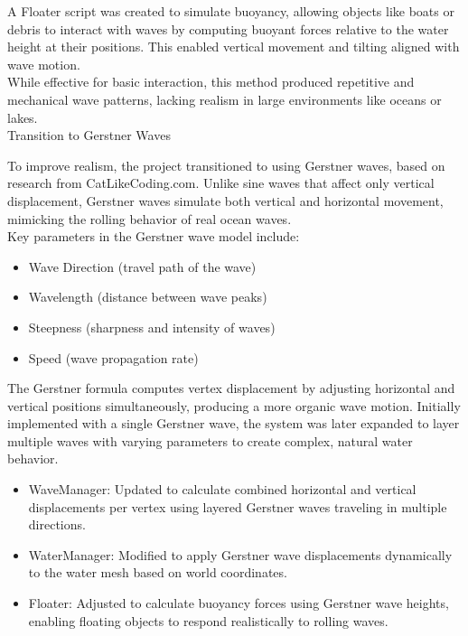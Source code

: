 \documentclass{article}
\begin{document}
A Floater script was created to simulate buoyancy, allowing objects like boats or debris to interact with waves by computing buoyant forces relative to the water height at their positions. This enabled vertical movement and tilting aligned with wave motion.\\

While effective for basic interaction, this method produced repetitive and mechanical wave patterns, lacking realism in large environments like oceans or lakes.\\

\noindent Transition to Gerstner Waves

To improve realism, the project transitioned to using Gerstner waves, based on research from CatLikeCoding.com. Unlike sine waves that affect only vertical displacement, Gerstner waves simulate both vertical and horizontal movement, mimicking the rolling behavior of real ocean waves.\\

Key parameters in the Gerstner wave model include:
\begin{itemize}
    \item Wave Direction (travel path of the wave)
    \item Wavelength (distance between wave peaks)
    \item Steepness (sharpness and intensity of waves)
    \item Speed (wave propagation rate)
\end{itemize}

The Gerstner formula computes vertex displacement by adjusting horizontal and vertical positions simultaneously, producing a more organic wave motion. Initially implemented with a single Gerstner wave, the system was later expanded to layer multiple waves with varying parameters to create complex, natural water behavior.

\begin{itemize}
    \item WaveManager: Updated to calculate combined horizontal and vertical displacements per vertex using layered Gerstner waves traveling in multiple directions.
    \item WaterManager: Modified to apply Gerstner wave displacements dynamically to the water mesh based on world coordinates.
    \item Floater: Adjusted to calculate buoyancy forces using Gerstner wave heights, enabling floating objects to respond realistically to rolling waves.
\end{itemize}
\end{document}
